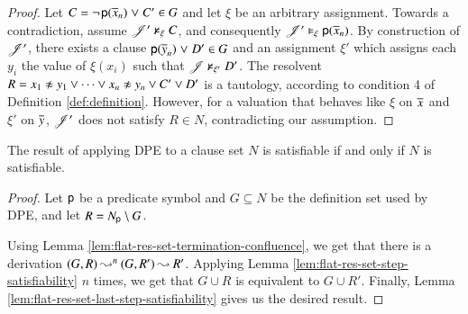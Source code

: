\begin{rep}
\begin{proof}
      Let $C = \neg{\kern.2ex \mathsf{p}(\overline{x}_{n})} \mathrel{\lor} C' \in G$ and let $\xi$ be
      an arbitrary assignment. Towards a contradiction, assume
      $\mathscr{J}'\nvDash_\xi C$, and consequently $\mathscr{J}' \vDash_\xi
      \mathsf{p}(\overline{x}_{n})$. By construction of $\mathscr{J}'$, there exists a clause
      ${\mathsf{p}(\overline{y}_{n})} \mathrel{\lor} D' \in G$ and an assignment $\xi'$
      which assigns each $y_i$ the value of $\xi(x_i)$ such that $\mathscr{J}
      \nvDash_{\xi'} D'$. The resolvent $R = \neqlit{x_1}{y_1} \lor \cdots \lor
      \neqlit{x_n}{y_n} \lor C' \lor D'$ is a tautology, according to condition
      4 of Definition \ref{def:definition}. However, for a valuation that
      behaves like $\xi$ on $\overline{x}_{}$ and $\xi'$ on $\overline{y}_{}$,
      $\mathscr{J}'$ does not satisfy $R \in N$, contradicting our assumption.
   \qedhere
   \end{proof}
\end{rep}
\begin{conf}

\end{conf}
\begin{theorem}
\label{thm:pes-sat-equiv}
   The result of applying DPE to a clause set $N$ is
   satisfiable if and only if $N$ is satisfiable.
\end{theorem}
\begin{rep}
\begin{proof}
   Let $\mathsf{p}$ be a predicate symbol and $G \subseteq N$ be the
   definition set used by DPE, and let $R = N_{\mathsf{p}} \setminus G$.
%

   Using Lemma
   \ref{lem:flat-res-set-termination-confluence}, we get that there is a
   derivation $(G,R) \mathbin\leadsto^n (G,R') \mathbin\leadsto R'$. Applying Lemma
   \ref{lem:flat-res-set-step-satisfiability} $n$ times, we get that $G \cup R$
   is equivalent to $G \cup R'$. Finally, Lemma \ref{lem:flat-res-set-last-step-satisfiability}
   gives us the desired result.
\end{proof}
\end{rep}

